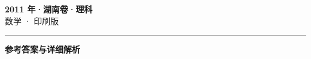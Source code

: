\documentclass[zihao=5, a4paper]{ctexart}
\begin{document}
\begin{center}
  {\Large\bfseries 2011 年·湖南卷·理科}\\[4pt]
  {\large 数学 · 印刷版}
\end{center}
\medskip
{}

\par\bigskip\hrule\bigskip
{}
\begin{center}{\large\bfseries 参考答案与详细解析}\end{center}
\smallskip

\end{document}
